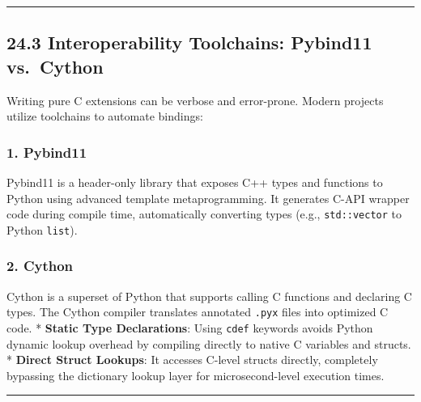 \begin{center}\rule{0.5\linewidth}{0.5pt}\end{center}

\hypertarget{interoperability-toolchains-pybind11-vs.-cython}{%
\subsection{24.3 Interoperability Toolchains: Pybind11
vs.~Cython}\label{interoperability-toolchains-pybind11-vs.-cython}}

Writing pure C extensions can be verbose and error-prone. Modern
projects utilize toolchains to automate bindings:

\hypertarget{pybind11}{%
\subsubsection{1. Pybind11}\label{pybind11}}

Pybind11 is a header-only library that exposes C++ types and functions
to Python using advanced template metaprogramming. It generates C-API
wrapper code during compile time, automatically converting types (e.g.,
\passthrough{\lstinline!std::vector!} to Python
\passthrough{\lstinline!list!}).

\hypertarget{cython}{%
\subsubsection{2. Cython}\label{cython}}

Cython is a superset of Python that supports calling C functions and
declaring C types. The Cython compiler translates annotated
\passthrough{\lstinline!.pyx!} files into optimized C code. *
\textbf{Static Type Declarations}: Using \passthrough{\lstinline!cdef!}
keywords avoids Python dynamic lookup overhead by compiling directly to
native C variables and structs. * \textbf{Direct Struct Lookups}: It
accesses C-level structs directly, completely bypassing the dictionary
lookup layer for microsecond-level execution times.

\begin{center}\rule{0.5\linewidth}{0.5pt}\end{center}
